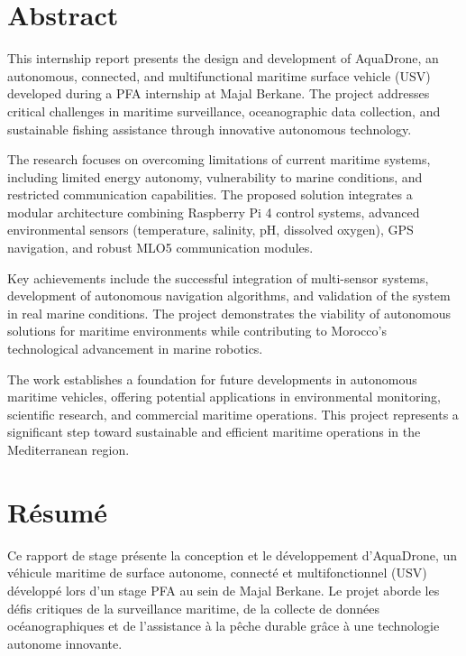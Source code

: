 \thispagestyle{plain}


\chapter*{Abstract}
This internship report presents the design and development of AquaDrone, an autonomous, connected, and multifunctional maritime surface vehicle (USV) developed during a PFA internship at Majal Berkane. The project addresses critical challenges in maritime surveillance, oceanographic data collection, and sustainable fishing assistance through innovative autonomous technology.

The research focuses on overcoming limitations of current maritime systems, including limited energy autonomy, vulnerability to marine conditions, and restricted communication capabilities. The proposed solution integrates a modular architecture combining Raspberry Pi 4 control systems, advanced environmental sensors (temperature, salinity, pH, dissolved oxygen), GPS navigation, and robust MLO5 communication modules.

Key achievements include the successful integration of multi-sensor systems, development of autonomous navigation algorithms, and validation of the system in real marine conditions. The project demonstrates the viability of autonomous solutions for maritime environments while contributing to Morocco's technological advancement in marine robotics.

The work establishes a foundation for future developments in autonomous maritime vehicles, offering potential applications in environmental monitoring, scientific research, and commercial maritime operations. This project represents a significant step toward sustainable and efficient maritime operations in the Mediterranean region.

\MediaOptionLogicBlank

\chapter*{Résumé}
Ce rapport de stage présente la conception et le développement d'AquaDrone, un véhicule maritime de surface autonome, connecté et multifonctionnel (USV) développé lors d'un stage PFA au sein de Majal Berkane. Le projet aborde les défis critiques de la surveillance maritime, de la collecte de données océanographiques et de l'assistance à la pêche durable grâce à une technologie autonome innovante.

